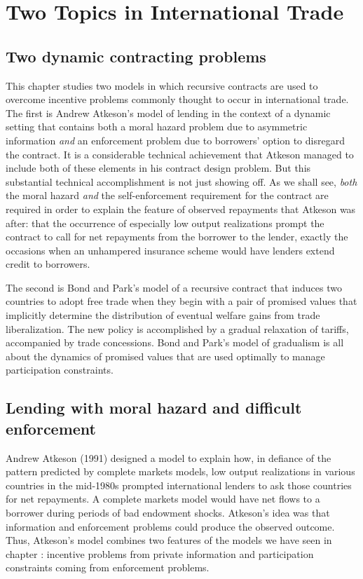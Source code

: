 



\chapter{Two Topics in International Trade\label{wldtrade}}
\section{Two dynamic contracting problems}

This chapter studies two models in which recursive contracts are
used to overcome incentive problems commonly thought to occur in
international trade.  The first is Andrew Atkeson's model of
lending in the context of a dynamic setting that contains both a
moral hazard problem due to asymmetric information {\it and\/} an
enforcement problem due to borrowers' option to disregard the
contract. It is a considerable technical achievement that Atkeson
managed to include both of these elements in his contract design
problem.  But this substantial technical accomplishment is not
just showing off. As we shall see, {\it both\/} the moral hazard
{\it and\/} the self-enforcement requirement for the contract are
required in order to explain the feature of observed repayments
that Atkeson was after: that the occurrence of especially low
output realizations prompt the contract to call for net repayments
from the borrower to the lender, exactly the occasions when an
unhampered insurance scheme would have lenders extend credit to
borrowers.

The  second is Bond and Park's model of a recursive contract that induces two countries
to adopt free trade when they begin with a pair of
 promised values that implicitly determine the distribution
of eventual welfare gains from trade liberalization.
The new
policy is accomplished by a gradual relaxation of tariffs, accompanied by
trade concessions.  Bond and Park's model of gradualism is all about the
dynamics of promised values that are used optimally to manage participation
constraints.
    
\section{Lending with moral hazard and difficult enforcement}
Andrew Atkeson (1991) designed a model to explain how, in defiance
of the pattern predicted by complete markets models, low output
realizations in various countries in the mid-1980s prompted
international lenders to ask those countries for net repayments.  A complete
markets model would have net flows to a borrower during
periods of bad endowment shocks.  Atkeson's idea was that
information and enforcement problems could produce the
observed  outcome.  Thus,  Atkeson's model combines two
features of the  models we have seen in chapter :
incentive problems from private information and participation
constraints coming from enforcement problems.


